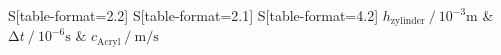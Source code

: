 \begin{table}
    \centering
    \caption{Bestimmung der Schallgeschwindigkeit mittels Durchschallungs-Methode.}
    \label{tab:1}
    \begin{tabular}{
	S[table-format=2.2]
	S[table-format=2.1]
	S[table-format=4.2]
	}
	\toprule
	{$h_{\text{zylinder}} \:/\: 10^{-3} \si{\metre}$}		& {$\increment t \:/\: 10^{-6} \si{\second} $}		& 
	{$c_\text{Acryl} \:/\: \si{\metre\per\second} $}		\\ 
	\midrule
    
    \bottomrule
    \end{tabular}
    \end{table}
